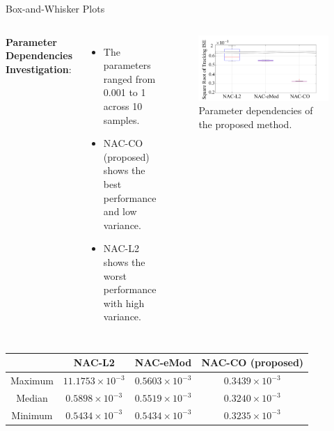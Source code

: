 \documentclass[8pt, aspectratio=169]{beamer}
\begin{document}
\begin{frame}{\insertsubsectionhead}{Box-and-Whisker Plots}
  
  \begin{columns}
    
      \textbf{Parameter Dependencies Investigation}:

      \begin{itemize}
        \item The parameters ranged from 0.001 to 1 across 10 samples.
        \item NAC-CO (proposed) shows the best performance and low variance.
        \item NAC-L2 shows the worst performance with high variance.
      \end{itemize}


      \begin{figure}
        \includegraphics[width=.99\textwidth]{figures/BoxWhisker.drawio.png}
        \caption{Parameter dependencies of the proposed method.}
      \end{figure}

  \end{columns}

    \begin{table}[!t]
      \renewcommand{\arraystretch}{1.1}
      \centering
      \begin{tabular}{c c c c }
      \hline
      & \textbf{NAC-L2}\!&\!\textbf{NAC-eMod}\!&\!\textbf{NAC-CO} (proposed) 
      \\
      \hline
      \hline 
        Maximum\!&\!$11.1753\!\times\!10^{-3}$\!&\!$0.5603\!\times\!10^{-3}$\!&\!$0.3439\!\times\!10^{-3}$\!\\
      \hline
        Median\!&\!$0.5898\!\times\!10^{-3}$\!&\!$0.5519\!\times\!10^{-3}$\!&\!$0.3240\!\times\!10^{-3}$\!\\
      \hline
        Minimum\!&\!$0.5434\!\times\!10^{-3}$\!&\!$0.5434\!\times\!10^{-3}$\!&\!$0.3235\!\times\!10^{-3}$\!\\
      \hline
      \end{tabular}
      \label{table: error norm}
    \end{table}
    

\end{frame}
\end{document}
